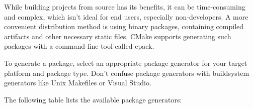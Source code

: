 While building projects from source has its benefits, it can be time-consuming and complex, which isn’t ideal for end users, especially non-developers. A more convenient distribution method is using binary packages, containing compiled artifacts and other necessary static files. CMake supports generating such packages with a command-line tool called cpack.


To generate a package, select an appropriate package generator for your target platform and package type. Don’t confuse package generators with buildsystem generators like Unix Makefiles or Visual Studio.

The following table lists the available package generators:

